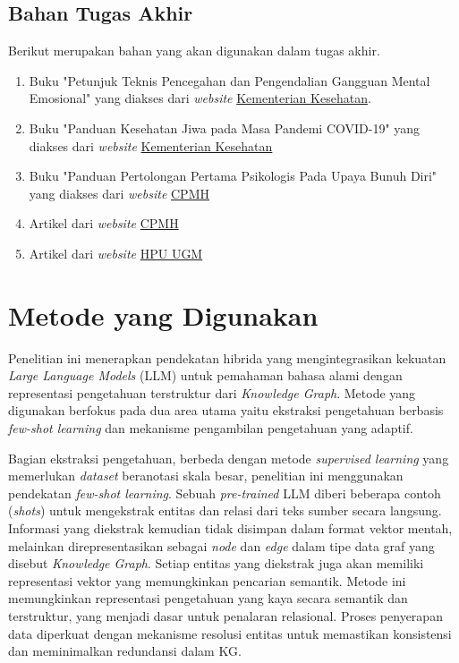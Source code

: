 \subsection{Bahan Tugas Akhir}
Berikut merupakan bahan yang akan digunakan dalam tugas akhir.
\begin{enumerate}
	\item Buku "Petunjuk Teknis Pencegahan dan Pengendalian Gangguan Mental Emosional" yang diakses dari \textit{website} \href{https://repository.kemkes.go.id/book/1258}{Kementerian Kesehatan}.
	\item Buku "Panduan Kesehatan Jiwa pada Masa Pandemi COVID-19" yang diakses dari \textit{website} \href{https://pusatkrisis.kemkes.go.id/panduan-kesehatan-jiwa-pada-masa-pandemi-covid-19}{Kementerian Kesehatan}
	\item Buku "Panduan Pertolongan Pertama Psikologis Pada Upaya Bunuh Diri" yang diakses dari \textit{website} \href{https://cpmh.psikologi.ugm.ac.id/wp-content/uploads/sites/39/2021/11/Panduan-Pertolongan-Pertama-Pencegahan-Bunuh-Diri_v1.pdf}{CPMH}
	\item Artikel dari \textit{website} \href{https://cpmh.psikologi.ugm.ac.id/}{CPMH}
	\item Artikel dari \textit{website} \href{https://hpu.ugm.ac.id}{HPU UGM}
\end{enumerate}

\section{Metode yang Digunakan}
Penelitian ini menerapkan pendekatan hibrida yang mengintegrasikan kekuatan \textit{Large Language Models} (LLM) untuk pemahaman bahasa alami dengan representasi pengetahuan terstruktur dari \textit{Knowledge Graph}.
Metode yang digunakan berfokus pada dua area utama yaitu ekstraksi pengetahuan berbasis \textit{few-shot learning} dan mekanisme pengambilan pengetahuan yang adaptif.

Bagian ekstraksi pengetahuan, berbeda dengan metode \textit{supervised learning} yang memerlukan \textit{dataset} beranotasi skala besar, penelitian ini menggunakan pendekatan \textit{few-shot learning}.
Sebuah \textit{pre-trained} LLM diberi beberapa contoh (\textit{shots}) untuk mengekstrak entitas dan relasi dari teks sumber secara langsung.
Informasi yang diekstrak kemudian tidak disimpan dalam format vektor mentah, melainkan direpresentasikan sebagai \textit{node} dan \textit{edge} dalam tipe data graf yang disebut \textit{Knowledge Graph}.
Setiap entitas yang diekstrak juga akan memiliki representasi vektor yang memungkinkan pencarian semantik.
Metode ini memungkinkan representasi pengetahuan yang kaya secara semantik dan terstruktur, yang menjadi dasar untuk penalaran relasional.
Proses penyerapan data diperkuat dengan mekanisme resolusi entitas untuk memastikan konsistensi dan meminimalkan redundansi dalam KG.

